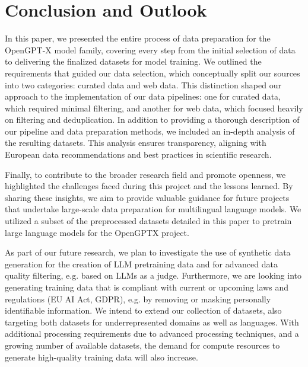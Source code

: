 \section{Conclusion and Outlook}\label{sec:conclusion}

In this paper, we presented the entire process of data preparation for the OpenGPT-X model 
family, covering every step from the initial selection of data to delivering the finalized 
datasets for model training. We outlined the requirements that guided our 
data selection, which conceptually split our sources into two categories: curated data and web data. This distinction shaped our approach to the implementation of our data pipelines: one for curated data, which required minimal filtering, and another 
for web data, which focused heavily on filtering and deduplication. In addition to providing 
a thorough description of our pipeline and data preparation methods, we included an 
in-depth analysis of the resulting datasets. 
This analysis ensures transparency, aligning with European data recommendations and 
best practices in scientific research.

Finally, to contribute to the broader research field and promote openness, we 
highlighted the challenges faced during this project and the lessons learned. By sharing these insights, we aim to provide valuable guidance for future projects that undertake large-scale data preparation for multilingual  language models. We utilized a subset of the preprocessed datasets 
detailed in this paper to pretrain large language models for the OpenGPTX project. 


As part of our future research, we plan to investigate the use of 
synthetic data generation for the creation of LLM pretraining data 
and for advanced data quality filtering, e.g. based on LLMs as a judge.
Furthermore, we are looking into generating training data that is compliant
with current or upcoming laws and regulations (EU AI Act, GDPR), e.g.
by removing or masking personally identifiable information.
We intend to extend our collection of datasets, also targeting
both datasets for underrepresented domains as well as languages.
With additional processing requirements due to 
advanced processing techniques,
and a growing number of available datasets, 
the demand for compute resources to generate high-quality training data
will also increase.










